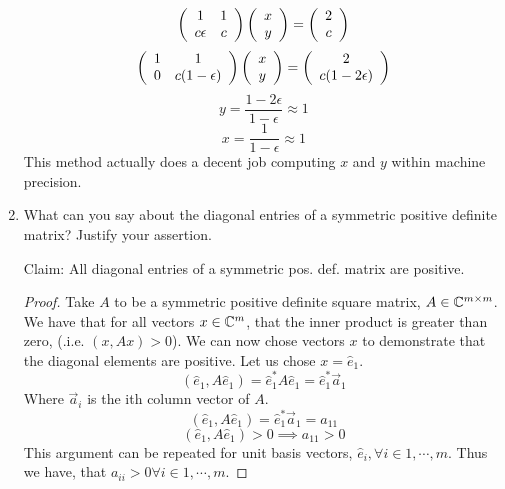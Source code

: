\documentclass{article}
\begin{document}
\begin{enumerate}
\[
\left(\begin{array}{c c}
1 & 1 \\
c\epsilon & c 
\end{array}\right) \left(\begin{array}{c}
x \\
y
\end{array}\right) = \left(\begin{array}{c}
2 \\ 
c
\end{array}\right) 
\]
\[
\left(\begin{array}{c c}
1 & 1 \\
0 & c(1-\epsilon) 
\end{array}\right) \left(\begin{array}{c}
x \\
y
\end{array}\right) = \left(\begin{array}{c}
2 \\ 
c(1-2\epsilon)
\end{array}\right) 
\]
\[
    y = \frac{1 - 2\epsilon}{1 - \epsilon} \approx 1
\]
\[
    x = \frac{1}{1- \epsilon} \approx 1
\]
This method actually does a decent job computing $x$ and $y$ within machine precision.

\item   What can you say about the diagonal entries of a symmetric positive definite matrix? Justify your assertion.

Claim: All diagonal entries of a symmetric pos. def. matrix are positive. 

\begin{proof}
    Take $A$ to be a symmetric positive definite square matrix, $A \in \mathbb{C}^{m\times m}$. We have that for all vectors $x \in \mathbb{C}^m$, that the inner product is greater than zero, (.i.e. $(x, Ax) > 0$). We can now chose vectors $x$ to demonstrate that the diagonal elements are positive. Let us chose $x = \hat{e}_1$.
\[
    (\hat{e}_1, A\hat{e}_1) = \hat{e}_1^*A\hat{e}_1 = \hat{e}_1^*\vec{a}_1
\]
Where $\vec{a}_i$ is the ith column vector of $A$. 
\[
    (\hat{e}_1, A\hat{e}_1) = \hat{e}_1^*\vec{a}_1 = a_{11} 
\]
\[
      (\hat{e}_1, A\hat{e}_1) > 0 \implies a_{11} > 0
\]
This argument can be repeated for unit basis vectors, $\hat{e}_i, \forall i \in 1, \cdots, m$. Thus we have, that $a_{ii} > 0 \forall i \in 1, \cdots, m$.
\end{proof}



\end{enumerate}
\end{document}
